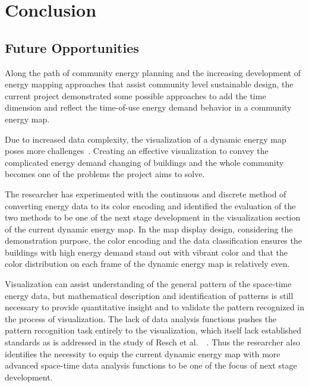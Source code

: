 
\chapter{Conclusion} %

\label{Chapter8} %


\section{Future Opportunities}
Along the path of community energy planning and the increasing
development of energy mapping approaches that assist community level
sustainable design, the current project demonstrated some possible
approaches to add the time dimension and reflect the time-of-use
energy demand behavior in a community energy map.

Due to increased data complexity, the visualization of a dynamic
energy map poses more challenges~\cite{Dorling1992}. Creating an
effective visualization to convey the complicated energy demand
changing of buildings and the whole community becomes one of the
problems the project aims to solve.

The researcher has experimented with the continuous and discrete
method of converting energy data to its color encoding and identified
the evaluation of the two methods to be one of the next stage
development in the visualization section of the current dynamic energy
map. In the map display design, considering the demonstration purpose,
the color encoding and the data classification ensures the buildings
with high energy demand stand out with vibrant color and that the
color distribution on each frame of the dynamic energy map is
relatively even.

Visualization can assist understanding of the general pattern of the
space-time energy data, but mathematical description and
identification of patterns is still necessary to provide quantitative
insight and to validate the pattern recognized in the process of
visualization. The lack of data analysis functions pushes the pattern
recognition task entirely to the visualization, which itself lack
established standards as is addressed in the study of Resch et al.\
~\cite{Resch2014}. Thus the researcher also identifies the necessity
to equip the current dynamic energy map with more advanced space-time
data analysis functions to be one of the focus of next stage
development.

